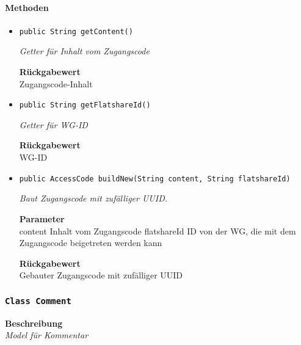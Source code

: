     \paragraph*{Methoden}
    \begin{itemize}
    	\item{\texttt{public String getContent()}}
    	
    	\textit{Getter für Inhalt vom Zugangscode}
    	
    	
    	
    	\textbf{Rückgabewert} \\
    	Zugangscode-Inhalt        \item{\texttt{public String getFlatshareId()}}
    	
    	\textit{Getter für WG-ID}
    	
    	
    	
    	\textbf{Rückgabewert} \\
    	WG-ID        \item{\texttt{public AccessCode buildNew(String content, String flatshareId)}}
    	
    	\textit{Baut Zugangscode mit zufälliger UUID.}
    	
    	\textbf{Parameter} \\
    	content Inhalt vom Zugangscode
    	flatshareId ID von der WG, die mit dem Zugangscode beigetreten werden kann
    	
    	\textbf{Rückgabewert} \\
    	Gebauter Zugangscode mit zufälliger UUID
    \end{itemize}
    \subsubsection{\texttt{Class Comment}}
    \textbf{Beschreibung} \\
    \textit{Model für Kommentar}
